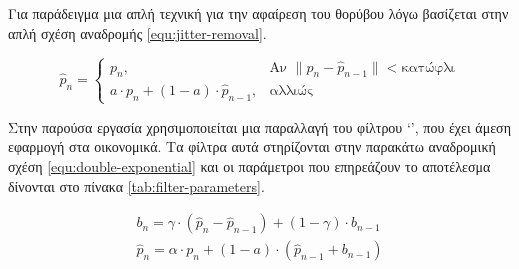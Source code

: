 Για παράδειγμα μια απλή τεχνική για την αφαίρεση του θορύβου λόγω  βασίζεται στην απλή σχέση αναδρομής \ref{equ:jitter-removal}.

\begin{equation}
    \hat{p}_{n} =
    \begin{cases}
        p_{n}, & \text{Αν } \|p_{n} - \hat{p}_{n-1}\| < \text{κατώφλι} \\
        a \cdot p_{n} + (1-a) \cdot \hat{p}_{n-1}, & \text{αλλιώς}
    \end{cases}
    \label{equ:jitter-removal}
\end{equation}

Στην παρούσα εργασία χρησιμοποιείται μια παραλλαγή του φίλτρου \cite{filter12} \lq {}\rq , που έχει άμεση εφαρμογή στα οικονομικά. Τα φίλτρα αυτά στηρίζονται στην παρακάτω αναδρομική σχέση \ref{equ:double-exponential} και οι παράμετροι που επηρεάζουν το αποτέλεσμα δίνονται στο πίνακα \ref{tab:filter-parameters}.

\begin{equation}
    \begin{aligned}
        b_{n} = \gamma \cdot (\hat{p}_{n} - \hat{p}_{n-1}) + (1 - \gamma) \cdot b_{n-1}\\[10pt]
        \hat{p}_{n} = \alpha \cdot p_{n} + (1 - a) \cdot (\hat{p}_{n-1} + b_{n-1})
    \end{aligned}
    \label{equ:double-exponential}
\end{equation}

\vspace{10pt}

